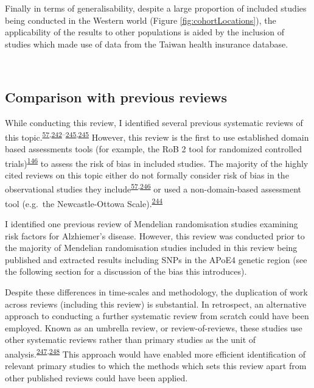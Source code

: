 \documentclass[a4paper, twoside]{templates/ociamthesis}
\begin{document}
Finally in terms of generalisability, despite a large proportion of included studies being conducted in the Western world (Figure \ref{fig:cohortLocations}), the applicability of the results to other populations is aided by the inclusion of studies which made use of data from the Taiwan health insurance database.

~

\hypertarget{rev-previous-reviews}{%
\subsection{Comparison with previous reviews}\label{rev-previous-reviews}}

While conducting this review, I identified several previous systematic reviews of this topic.\textsuperscript{\protect\hyperlink{ref-chu2018}{57},\protect\hyperlink{ref-yang2020}{242}--\protect\hyperlink{ref-kuzma2018a}{245},\protect\hyperlink{ref-kuzma2018a}{245}} However, this review is the first to use established domain based assessments tools (for example, the RoB 2 tool for randomized controlled trials)\textsuperscript{\protect\hyperlink{ref-sterne2019}{146}} to assess the risk of bias in included studies. The majority of the highly cited reviews on this topic either do not formally consider risk of bias in the observational studies they include\textsuperscript{\protect\hyperlink{ref-chu2018}{57},\protect\hyperlink{ref-power2015}{246}} or used a non-domain-based assessment tool (e.g.~the Newcastle-Ottowa Scale).\textsuperscript{\protect\hyperlink{ref-poly2020}{244}}

I identified one previous review of Mendelian randomisation studies examining risk factors for Alzhiemer's disease. However, this review was conducted prior to the majority of Mendelian randomisation studies included in this review being published and extracted results including SNPs in the APoE4 genetic region (see the following section for a discussion of the bias this introduces).

Despite these differences in time-scales and methodology, the duplication of work across reviews (including this review) is substantial. In retrospect, an alternative approach to conducting a further systematic review from scratch could have been employed. Known as an umbrella review, or review-of-reviews, these studies use other systematic reviews rather than primary studies as the unit of analysis.\textsuperscript{\protect\hyperlink{ref-aromataris2015}{247},\protect\hyperlink{ref-smith2011}{248}} This approach would have enabled more efficient identification of relevant primary studies to which the methods which sets this review apart from other published reviews could have been applied.
\end{document}
